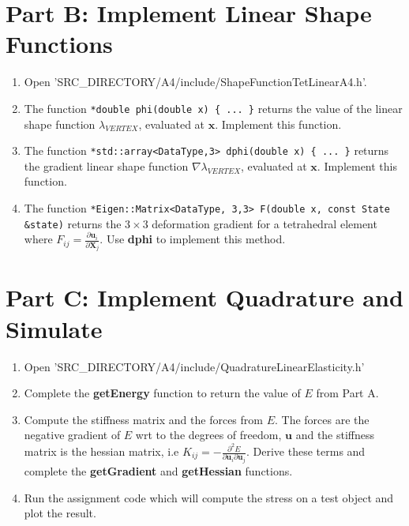 \documentclass[11pt]{article}
\begin{document}
 

\section*{Part B: Implement Linear Shape Functions}

\begin{enumerate}
    \item Open '{SRC\_DIRECTORY}/A4/include/ShapeFunctionTetLinearA4.h'.
    \item  The function \texttt{*double phi(double x) \{ ... \}} returns the value of the linear shape function
    $\lambda_{VERTEX}$, evaluated at $\mathbf{x}$. Implement this function.
    \item The function \texttt{*std::array<DataType,3> dphi(double x) \{ ... \}} returns the gradient linear shape function
    $\nabla\lambda_{VERTEX}$, evaluated at $\mathbf{x}$. Implement this function.
    \item The function \texttt{*Eigen::Matrix<DataType, 3,3> F(double x, const State \&state)} returns the $3\times3$
    deformation gradient for a tetrahedral element where $F_{ij}=\frac{\partial \mathbf{u}_i}{\partial \mathbf{X}_j}$. Use \textbf{dphi} to implement this method.
\end{enumerate}

\section*{Part C: Implement Quadrature and Simulate}

\begin{enumerate}
    \item Open '{SRC\_DIRECTORY}/A4/include/QuadratureLinearElasticity.h'
    \item Complete the \textbf{getEnergy} function to return the value of $E$ from Part A.
    \item Compute the stiffness matrix and the forces from $E$. The forces are the negative gradient of $E$ wrt to
    the degrees of freedom, $\mathbf{u}$ and the stiffness matrix is the hessian matrix, i.e $K_{ij} = - \frac{\partial^2 E}{\partial \mathbf{u}_i \partial \mathbf{u}_j}$. Derive these terms and complete the \textbf{getGradient} and \textbf{getHessian} functions.
    \item Run the assignment code which will compute the stress on a test object and plot the result.
\end{enumerate}
\end{document}
